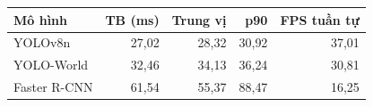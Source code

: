 \begin{tabular}{lrrrr}
\toprule
Mô hình & TB (ms) & Trung vị & p90 & FPS tuần tự \\
\midrule
YOLOv8n & 27{,}02 & 28{,}32 & 30{,}92 & 37{,}01 \\
YOLO-World & 32{,}46 & 34{,}13 & 36{,}24 & 30{,}81 \\
Faster R-CNN & 61{,}54 & 55{,}37 & 88{,}47 & 16{,}25 \\
\bottomrule
\end{tabular}
